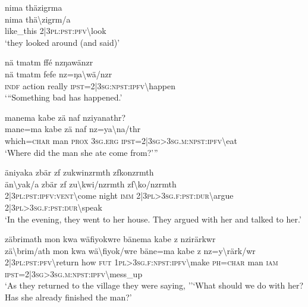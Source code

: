 \ea\label{ex:7:a4787}
nima thäzigrma\\
\gll nima	thä{\textbackslash}zigrm/a\\
     like\_this	2|3\textsc{pl}:\textsc{pst}:\textsc{pfv}{\textbackslash}look\\
\glt `they looked around (and said)'
\z

\ea\label{ex:7:a4788}
nä tmatm ffé nzŋawänzr\\
\gll nä	tmatm	fefe	nz=ŋa{\textbackslash}wä/nzr\\
     \textsc{indf}	action	really	\textsc{ipst}=2|3\textsc{sg}:\textsc{npst}:\textsc{ipfv}{\textbackslash}happen\\
\glt `{``}Something bad has happened.'
\z

\ea\label{ex:7:a4789}
manema kabe zä naf nziyanathr?\\
\gll mane=ma	kabe	zä	naf	nz=ya{\textbackslash}na/thr\\
     which=\textsc{char}	man	\textsc{prox}	3\textsc{sg}.\textsc{erg}	\textsc{ipst}=2|3\textsc{sg}>3\textsc{sg}.\textsc{m}:\textsc{npst}:\textsc{ipfv}{\textbackslash}eat\\
\glt `Where did the man she ate come from?'''
\z

\ea\label{ex:7:a4790}
äniyaka zbär zf zukwinzrmth zfkonzrmth\\
\gll än{\textbackslash}yak/a	zbär	zf	zu{\textbackslash}kwi/nzrmth	zf{\textbackslash}ko/nzrmth\\
     2|3\textsc{pl}:\textsc{pst}:\textsc{ipfv}:\textsc{vent}{\textbackslash}come	night	\textsc{imm}	2|3\textsc{pl}>3\textsc{sg}.\textsc{f}:\textsc{pst}:\textsc{dur}{\textbackslash}argue	2|3\textsc{pl}>3\textsc{sg}.\textsc{f}:\textsc{pst}:\textsc{dur}{\textbackslash}speak\\
\glt `In the evening, they went to her house. They argued with her and talked to her.'
\z

\ea\label{ex:7:a4792}
zäbrimath mon kwa wäfiyokwre bänema kabe z nzirärkwr\\
\gll zä{\textbackslash}brim/ath	mon	kwa	wä{\textbackslash}fiyok/wre	bäne=ma	kabe	z	nz=y{\textbackslash}rärk/wr\\
     2|3\textsc{pl}:\textsc{pst}:\textsc{pfv}{\textbackslash}return	how	\textsc{fut}	1\textsc{pl}>3\textsc{sg}.\textsc{f}:\textsc{npst}:\textsc{ipfv}{\textbackslash}make	\textsc{ph}=\textsc{char}	man	\textsc{iam}	\textsc{ipst}=2|3\textsc{sg}>3\textsc{sg}.\textsc{m}:\textsc{npst}:\textsc{ipfv}{\textbackslash}mess\_up\\
\glt `As they returned to the village they were saying, ''‘What should we do with her? Has she already finished the man?'
\z

